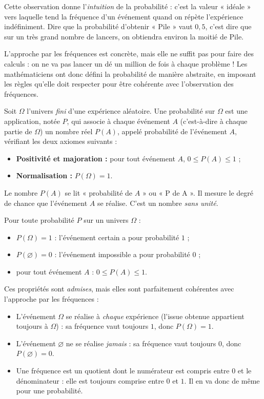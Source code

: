 \documentclass[11pt]{article}
\newcommand{\cle}[1]{{\popxbold\color{popdark}#1}}
\newcounter{popsec}
\newcounter{popsub}
\newcommand{\courssub}[1]{%
  \stepcounter{popsub}%
  \par\vspace{9pt}\noindent{\popxbold\fontsize{11.5}{13}\selectfont\color{popink}{\color{poporange}\thepopsec.\thepopsub}\hspace{6pt}#1}\par\nopagebreak\vspace{4pt}
}
\begin{document}
Cette observation donne l'\emph{intuition} de la probabilité : c'est la valeur « idéale » vers laquelle tend la fréquence d'un événement quand on répète l'expérience indéfiniment. Dire que la probabilité d'obtenir « Pile » vaut $0,5$, c'est dire que sur un très grand nombre de lancers, on obtiendra environ la moitié de Pile.

\courssub{Définition d'une probabilité}

L'approche par les fréquences est concrète, mais elle ne suffit pas pour faire des calculs : on ne va pas lancer un dé un million de fois à chaque problème ! Les mathématiciens ont donc défini la probabilité de manière abstraite, en imposant les règles qu'elle doit respecter pour être cohérente avec l'observation des fréquences.

\begin{definition}
Soit $\Omega$ l'univers \emph{fini} d'une expérience aléatoire. Une \cle{probabilité} sur $\Omega$ est une application, notée $P$, qui associe à chaque événement $A$ (c'est-à-dire à chaque partie de $\Omega$) un nombre réel $P(A)$, appelé \cle{probabilité de l'événement $A$}, vérifiant les deux axiomes suivants :
\begin{itemize}
\item \textbf{Positivité et majoration :} pour tout événement $A$, $0 \leq P(A) \leq 1$ ;
\item \textbf{Normalisation :} $P(\Omega) = 1$.
\end{itemize}
\end{definition}

Le nombre $P(A)$ se lit « probabilité de $A$ » ou « P de A ». Il mesure le degré de chance que l'événement $A$ se réalise. C'est un nombre \emph{sans unité}.

\begin{propriete}
Pour toute probabilité $P$ sur un univers $\Omega$ :
\begin{itemize}
\item $P(\Omega) = 1$ : l'événement certain a pour probabilité $1$ ;
\item $P(\varnothing) = 0$ : l'événement impossible a pour probabilité $0$ ;
\item pour tout événement $A$ : $0 \leq P(A) \leq 1$.
\end{itemize}
\end{propriete}

Ces propriétés sont \emph{admises}, mais elles sont parfaitement cohérentes avec l'approche par les fréquences :
\begin{itemize}
\item L'événement $\Omega$ se réalise à \emph{chaque} expérience (l'issue obtenue appartient toujours à $\Omega$) : sa fréquence vaut toujours $1$, donc $P(\Omega) = 1$.
\item L'événement $\varnothing$ ne se réalise \emph{jamais} : sa fréquence vaut toujours $0$, donc $P(\varnothing) = 0$.
\item Une fréquence est un quotient dont le numérateur est compris entre $0$ et le dénominateur : elle est toujours comprise entre $0$ et $1$. Il en va donc de même pour une probabilité.
\end{itemize}
\end{document}
